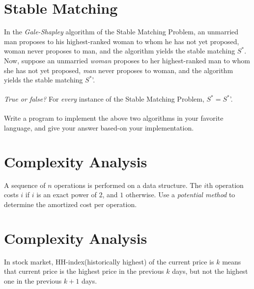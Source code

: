 \section{Stable Matching}
\noindent
In the \textit{Gale-Shapley} algorithm of the Stable Matching Problem,
an unmarried man proposes to his highest-ranked woman to whom he has not yet proposed, 
woman never proposes to man, and the algorithm yields the stable matching $S^*$.
Now, suppose an unmarried \textit{woman} proposes to her highest-ranked man 
to whom she has not yet proposed, \textit{man} never proposes to woman, 
and the algorithm yields the stable matching $S^*$'.
\\ \\
\textit{True or false?} For \textit{every} instance of the Stable Matching Problem, $S^* = S^*$'.
\\ \\
Write a program to implement the above two algorithms in your favorite language,
and give your answer based-on your implementation.
%
%
\section{Complexity Analysis}
\noindent
A sequence of $n$ operations is performed on a data structure.
The $i$th operation costs $i$ if $i$ is an exact power of $2$, and $1$ otherwise.
Use a \textit{potential method} to determine the amortized cost per operation.
%
%
\section{Complexity Analysis}
In stock market, HH-index(historically highest) of the current price is $k$ means that 
current price is the highest price in the previous $k$ days, 
but not the highest one in the previous $k+1$ days. 

